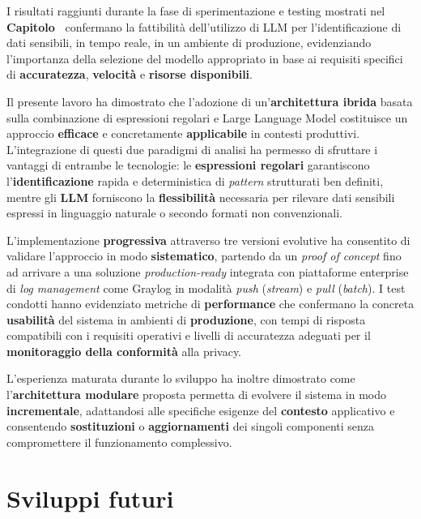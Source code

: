 \documentclass[12pt,twoside]{report}
\begin{document}
I risultati raggiunti durante la fase di sperimentazione e testing mostrati nel \textbf{Capitolo~} confermano la fattibilità dell'utilizzo di LLM per l'identificazione di dati sensibili, in tempo reale, in un ambiente di produzione, evidenziando l'importanza della selezione del modello appropriato in base ai requisiti specifici di \textbf{accuratezza}, \textbf{velocità} e \textbf{risorse disponibili}.

Il presente lavoro ha dimostrato che l'adozione di un'\textbf{architettura ibrida} basata sulla combinazione di espressioni regolari e Large Language Model costituisce un approccio \textbf{efficace} e concretamente \textbf{applicabile} in contesti produttivi. L'integrazione di questi due paradigmi di analisi ha permesso di sfruttare i vantaggi di entrambe le tecnologie: le \textbf{espressioni regolari} garantiscono l'\textbf{identificazione} rapida e deterministica di \textit{pattern} strutturati ben definiti, mentre gli \textbf{LLM} forniscono la \textbf{flessibilità} necessaria per rilevare dati sensibili espressi in linguaggio naturale o secondo formati non convenzionali.

L'implementazione \textbf{progressiva} attraverso tre versioni evolutive ha consentito di validare l'approccio in modo \textbf{sistematico}, partendo da un \textit{proof of concept} fino ad arrivare a una soluzione \textit{production-ready} integrata con piattaforme enterprise di \textit{log management} come Graylog in modalità \textit{push} (\textit{stream}) e \textit{pull} (\textit{batch}). I test condotti hanno evidenziato metriche di \textbf{performance} che confermano la concreta \textbf{usabilità} del sistema in ambienti di \textbf{produzione}, con tempi di risposta compatibili con i requisiti operativi e livelli di accuratezza adeguati per il \textbf{monitoraggio della conformità} alla privacy.

L'esperienza maturata durante lo sviluppo ha inoltre dimostrato come l'\textbf{architettura modulare} proposta permetta di evolvere il sistema in modo \textbf{incrementale}, adattandosi alle specifiche esigenze del \textbf{contesto} applicativo e consentendo \textbf{sostituzioni} o \textbf{aggiornamenti} dei singoli componenti senza compromettere il funzionamento complessivo.

\section{Sviluppi futuri}
\label{sec:sviluppi_futuri}
\end{document}
